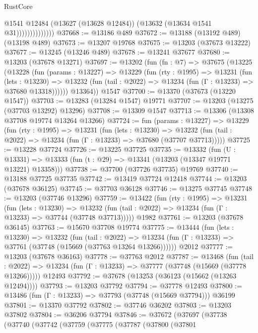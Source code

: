 \begin{lexlean}{RustCore}
\begin{coremodule}
                            @1541
                            @12484
                            (@13627 (@13628 @12484))
                            (@13632 (@13634 @1541 @31))))))))))))))
@37668 := @13186 @489
@37672 := @13188 (@13192 @489) (@13198 @489)
@37673 := @13207 @19768
@37675 := @13203 (@37673 @13222)
@37677 := @13245 (@13246 @489)
@37678 := @13241 @37677
@37680 := @13203 (@37678 @13271)
@37697 := @13202
    (fun (fn : @7) =>
    @37675
      (@13225
        (@13228
          (fun (params : @13227) =>
          @13229
            (fun (rty : @1995) =>
            @13231
              (fun (lets : @13230) =>
              @13232 (fun (tail : @2022) => @13234 (fun (Γ : @13233) => @37680 @13318))))))
        @13364))
    @1547
@37700 := @13370 (@37673 (@13220 @1547))
@37703 := @13283 (@13284 @1547) @19771
@37707 := @13203 (@13275 (@37703 @13292) @13296)
@37708 := @13309 @1547
@37713 := @13306 (@13308 @37708 @19774 @13264 @13266)
@37724 := fun (params : @13227) =>
  @13229
    (fun (rty : @1995) =>
    @13231
      (fun (lets : @13230) =>
      @13232 (fun (tail : @2022) => @13234 (fun (Γ : @13233) => @37680 (@37707 @37713)))))
@37725 := @13228 @37724
@37726 := @13225 @37725
@37735 := @13332
    (fun (U : @13331) => @13333 (fun (t : @29) => @13341 (@13203 (@13347 @19771 @13221) @13358)))
@37738 := @37700 (@37726 @37735) @19769
@37740 := @13188 @37725 @37735
@37742 := @13419 @37724 @12418
@37744 := @13203 (@37678 @36125)
@37745 := @37703 @36128
@37746 := @13275 @37745
@37748 := @13203 (@37746 @13296)
@37759 := @13422
    (fun (rty : @1995) =>
    @13231
      (fun (lets : @13230) =>
      @13232 (fun (tail : @2022) => @13234 (fun (Γ : @13233) => @37744 (@37748 @37713)))))
    @1982
@37761 := @13203 (@37678 @36145)
@37763 := @15670 @37708 @19774
@37775 := @13444
    (fun (lets : @13230) =>
    @13232
      (fun (tail : @2022) =>
      @13234 (fun (Γ : @13233) => @37761 (@37748 (@15669 (@37763 @13264 @13266))))))
    @2012
@37777 := @13203 (@37678 @36163)
@37778 := @37763 @2012
@37787 := @13468
    (fun (tail : @2022) => @13234 (fun (Γ : @13233) => @37777 (@37748 (@15669 (@37778 @13266)))))
    @12493
@37792 := @37678 (@13253 (@36123 (@15662 (@13263 @12494))))
@37793 := @13203 @37792
@37794 := @37778 @12493
@37800 := @13486 (fun (Γ : @13233) => @37793 (@37748 (@15669 @37794))) @36199
@37801 := @13370 @37792
@37802 := @37746 @36202
@37803 := @13203 @37802
@37804 := @36206 @37794
@37846 := @37672
    (@37697
      (@37738
        (@37740
          (@37742
            (@37759
              (@37775
                (@37787
                  (@37800
                    (@37801

\end{coremodule}
\end{lexlean}
